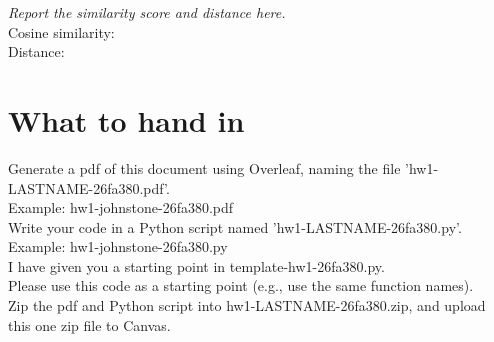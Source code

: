 \documentclass[10pt]{article}
\renewcommand{\(}{\left(}
\renewcommand{\)}{\right)}
\theoremstyle{plain}
\theoremstyle{plain}
\theoremstyle{definition}
\begin{document}
      \begin{shaded}
      {\em Report the similarity score and distance here.}\\
      Cosine similarity:  \\
      Distance:
      \end{shaded}

\section*{What to hand in}

Generate a pdf of this document using Overleaf,
naming the file 'hw1-LASTNAME-26fa380.pdf'.\\
Example: hw1-johnstone-26fa380.pdf\\[1em]
Write your code in a Python script named 'hw1-LASTNAME-26fa380.py'.\\
Example: hw1-johnstone-26fa380.py \\
I have given you a starting point in template-hw1-26fa380.py.\\
Please use this code as a starting point (e.g., use the same function names).\\[1em]
Zip the pdf and Python script into hw1-LASTNAME-26fa380.zip, 
and upload this one zip file to Canvas.
\end{document}
